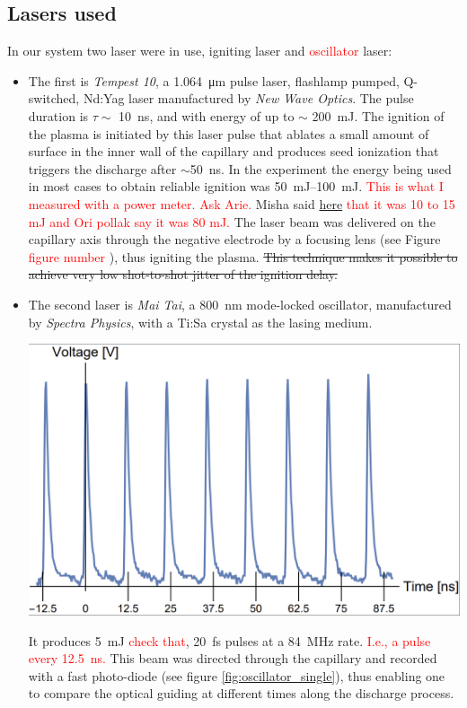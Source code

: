 \documentclass[justified,nofonts,nobib]{tufte-book}
\begin{document}
\subsection{Lasers used}\label{ssec:lasers}
In our system two laser were in use, igniting laser and \textcolor{red}{oscillator} laser:
\begin{itemize}
\item The first is \textit{Tempest 10}, a \SI{1.064}{\um} pulse laser, flashlamp pumped, Q-switched, Nd:Yag laser manufactured by \textit{New Wave Optics}. The pulse duration is $\tau \sim$ \SI{10}{\ns}, and with energy of up to $\sim$ \SI{200}{\mJ}. The ignition of the plasma is initiated by this laser pulse that ablates a small amount of surface in the inner wall of the capillary and produces seed ionization that triggers the discharge after $\sim$\SI{50}{\ns}. In the experiment the energy being used in most cases to obtain reliable ignition was \SIrange{50}{100}{\mJ}. \textcolor{red}{This is what I measured with a power meter. Ask Arie.} Misha said \href{https://aip.scitation.org/doi/full/10.1063/1.2149183}{here} \textcolor{red}{that it was 10 to 15 mJ and Ori pollak say it was 80 mJ.} The laser beam was delivered on the capillary axis through the negative electrode by a focusing lens (see Figure \textcolor{red}{figure number }), thus igniting the plasma. \st{This technique makes it possible to achieve very low shot-to-shot jitter of the ignition delay.}
\item The second laser is \textit{Mai Tai}, a \SI{800}{\nm} mode-locked oscillator, manufactured by \textit{Spectra Physics}, with a Ti:Sa crystal as the lasing medium.
\begin{marginfigure}
    \includegraphics[width=\marginparwidth]{figures/oscillator_single.PNG}
    \label{fig:oscillator_single}
    \caption{Oscillator laser, \SI{84}{\MHz} temporal beam profile.}
\end{marginfigure}
It produces \SI{5}{\mJ} \textcolor{red}{check that}, \SI{20}{\fs} pulses at a \SI{84}{\MHz} rate. \textcolor{red}{I.e., a pulse every \SI{12.5}{\ns}.} This beam was directed through the capillary and recorded with a fast photo-diode (see figure \ref{fig:oscillator_single}), thus enabling one to compare the optical guiding at different times along the discharge process.
\end{itemize}
\end{document}
